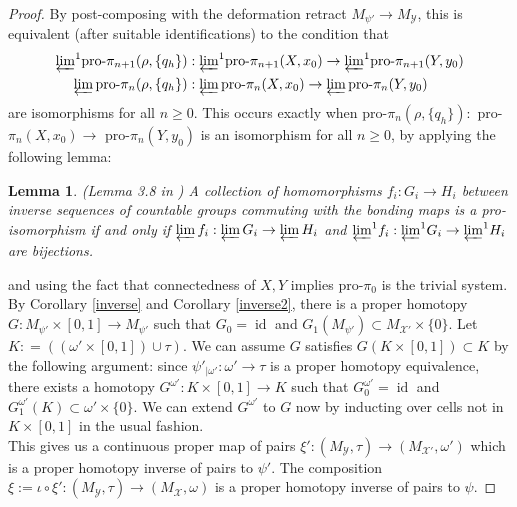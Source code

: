\documentclass[a4paper,11pt]{article}
\theoremstyle{definition}
\theoremstyle{plain}
\newtheorem{lemma}[definition]{Lemma}
\theoremstyle{remark}
\DeclareMathOperator{\id}{id}
\begin{document}
{\begin{proof}
By post-composing with the deformation retract $M_{\psi'}\rightarrow M_{\mathcal{Y}}$, this is equivalent (after suitable identifications) to the condition that 
\begin{align*}
{\varprojlim}^1 \text{pro-}\pi_{n+1}(\rho,\{q_{h}\})&: {\varprojlim}^1 \text{pro-}\pi_{n+1}(X,x_0)\rightarrow {\varprojlim}^1 \text{pro-}\pi_{n+1}(Y,y_0) \\
 \varprojlim \text{pro-}\pi_{n}(\rho,\{q_{h}\})&: \varprojlim \text{pro-}\pi_{n}(X,x_0)\rightarrow \varprojlim \text{pro-}\pi_{n}(Y,y_0)
\end{align*}
are isomorphisms for all $n\geq 0$.  This occurs exactly when pro-$\pi_{n}(\rho,\{q_{h}\}):$ pro-$\pi_{n}(X,x_0)\rightarrow$ pro-$\pi_{n}(Y,y_0)$ is an isomorphism for all $n\geq 0$, by applying the following lemma:

\begin{lemma} (Lemma 3.8 in \cite{melikhov2009steenrod}) A collection of homomorphisms $f_{i}:G_{i}\rightarrow H_{i}$ between inverse sequences of countable groups commuting with the bonding maps is a pro-isomorphism if and only if $\varprojlim f_{i}: \varprojlim G_{i}\rightarrow \varprojlim H_{i}$ and ${\varprojlim}^1 f_{i}: {\varprojlim}^1 G_{i}\rightarrow {\varprojlim}^1 H_{i}$ are bijections.  
\end{lemma}

and using the fact that connectedness of $X,Y$ implies pro-$\pi_{0}$ is the trivial system. \\

By Corollary \ref{inverse} and Corollary \ref{inverse2}, there is a proper homotopy $G: M_{\psi'} \times [0,1]\rightarrow M_{\psi'}$ such that $G_{0} = \id$ and $G_{1}(M_{\psi'})\subset  M_{\mathcal{X}'} \times \{0\}$. Let $K: = ((\omega' \times [0,1])\cup \tau)$.  We can assume $G$ satisfies $G(K \times [0,1]) \subset K$ by the following argument: since $\psi'_{|\omega'}: \omega' \rightarrow \tau$ is a proper homotopy equivalence, there exists a homotopy $G^{\omega'}: K \times [0,1] \rightarrow K$ such that $G^{\omega'}_{0} = \id$ and $G^{\omega'}_{1}(K) \subset \omega' \times \{0\}$. We can extend $G^{\omega'}$ to $G$ now by inducting over cells not in $K\times [0,1]$ in the usual fashion. \\

 This gives us a continuous proper map of pairs $\xi': (M_{\mathcal{Y}},\tau) \rightarrow (M_{\mathcal{X'}},\omega')$ which is a proper homotopy inverse of pairs to $\psi'$. The composition $\xi:=\iota \circ \xi' : (M_{\mathcal{Y}},\tau) \rightarrow (M_{\mathcal{X}},\omega)$ is a proper homotopy inverse of pairs to $\psi$. 
\end{proof}



}
\end{document}
